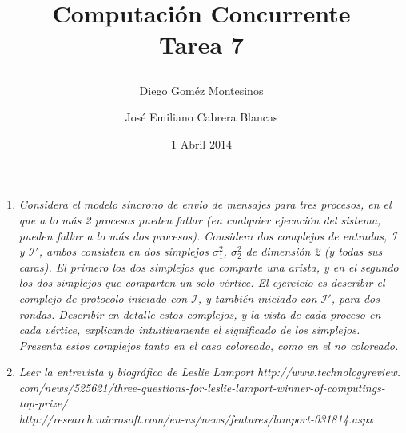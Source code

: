 \documentclass{article}
\title{ Computación Concurrente \\ \Large{Tarea 7}
\author{
  Diego Goméz Montesinos
  \and
  José Emiliano Cabrera Blancas
  }
\date{1 Abril 2014}
}
\begin{document}
\maketitle
\begin{enumerate}
  
  \item{
    \textsl{
      Considera el modelo sincrono de envio de mensajes para tres
      procesos, en el que a lo más 2 procesos pueden fallar (en
      cualquier ejecución del sistema, pueden fallar a lo más dos
      procesos). Considera dos complejos de entradas, $\mathcal{I}$ y
      $\mathcal{I}'$, ambos consisten en dos simplejos $\sigma_{1}^2$,
      $\sigma_{2}^2$ de dimensión 2 (y todas sus caras). El primero
      los dos simplejos que comparte una arista, y en el segundo los
      dos simplejos que comparten un solo vértice. El ejercicio es
      describir el complejo de protocolo iniciado con $\mathcal{I}$, y
      también iniciado con $\mathcal{I}'$, para dos rondas. Describir
      en detalle estos complejos, y la vista de cada proceso en cada
      vértice, explicando intuitivamente el significado de los
      simplejos. Presenta estos complejos tanto en el caso coloreado,
      como en el no coloreado.
    } 
  }

\item{
    \textsl{
      Leer la entrevista y biográfica de Leslie Lamport
      http://www.technologyreview. com/news/525621/three-questions-for-leslie-lamport-winner-of-computings-top-prize/
      \\ http://research.microsoft.com/en-us/news/features/lamport-031814.aspx 
    }

}
\end{enumerate}
\end{document}
